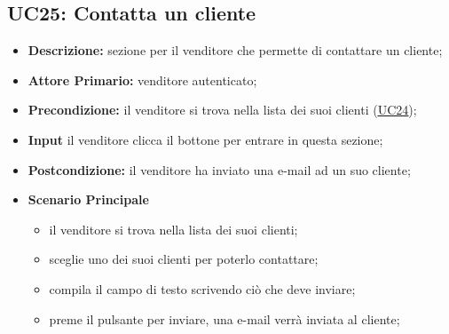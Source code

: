 \subsection{UC25: Contatta un cliente}
\label{sec:UC25}
\begin{itemize}
    \item \textbf{Descrizione:} sezione per il venditore che permette di contattare un cliente;
    \item \textbf{Attore Primario:} venditore autenticato;
    \item \textbf{Precondizione:} il venditore si trova nella lista dei suoi clienti (\hyperref[sec:UC24]{\underline{UC24}});
    \item \textbf{Input} il venditore clicca il bottone per entrare in questa sezione; 
    \item \textbf{Postcondizione:} il venditore ha inviato una e-mail ad un suo cliente;
    \item \textbf{Scenario Principale}
        \begin{itemize}
            \item il venditore si trova nella lista dei suoi clienti;
            \item sceglie uno dei suoi clienti per poterlo contattare;
            \item compila il campo di testo scrivendo ciò che deve inviare;
            \item preme il pulsante per inviare, una e-mail verrà inviata al cliente;
        \end{itemize}
\end{itemize}